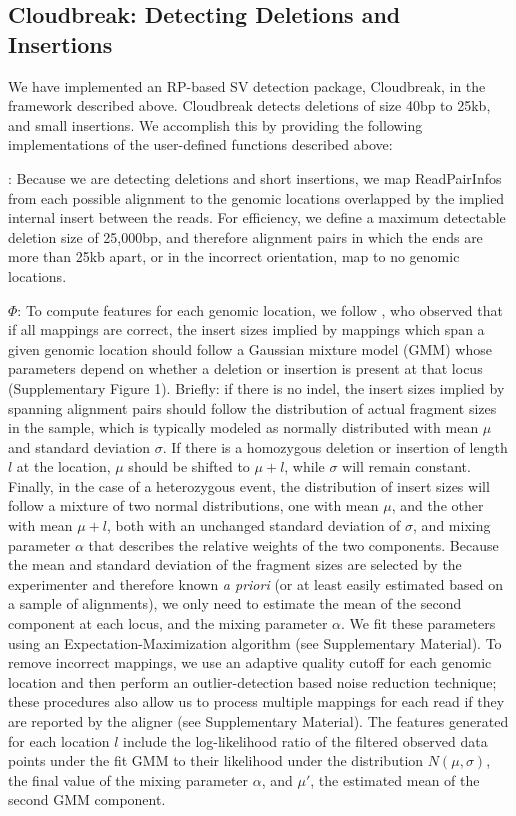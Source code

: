 \documentclass{bioinfo}
\newcommand{\todo}[1]{}
\begin{document}
\begin{methods}
\subsection{Cloudbreak: Detecting Deletions and Insertions}

We have implemented an RP-based SV detection package, Cloudbreak, in the framework described above. Cloudbreak detects deletions of size 40bp to 25kb, and small insertions. We accomplish this by providing the following implementations of the user-defined functions described above:

\textbf{}: Because we are detecting deletions and short insertions, we map ReadPairInfos from each possible alignment to the genomic locations overlapped by the implied internal insert between the reads. For efficiency, we define a maximum detectable deletion size of 25,000bp, and therefore alignment pairs in which the ends are more than 25kb apart, or in the incorrect orientation, map to no genomic locations.

\textbf{$\Phi$}: To compute features for each genomic location, we follow \cite{Lee:2009da}, who observed that if all mappings are correct, the insert sizes implied by mappings which span a given genomic location should follow a Gaussian mixture model (GMM) whose parameters depend on whether a deletion or insertion is present at that locus (Supplementary Figure 1\todo{\ref{Sinsert_size_mixes}}). Briefly: if there is no indel, the insert sizes implied by spanning alignment pairs should follow the distribution of actual fragment sizes in the sample, which is typically modeled as normally distributed with mean $\mu$ and standard deviation $\sigma$. If there is a homozygous deletion or insertion of length $l$ at the location, $\mu$ should be shifted to $\mu + l$, while $\sigma$ will remain constant. Finally, in the case of a heterozygous event, the distribution of insert sizes will follow a mixture of two normal distributions, one with mean $\mu$, and the other with mean $\mu + l$, both with an unchanged standard deviation of $\sigma$, and mixing parameter $\alpha$ that describes the relative weights of the two components. Because the mean and standard deviation of the fragment sizes are selected by the experimenter and therefore known \emph{a priori} (or at least easily estimated based on a sample of alignments), we only need to estimate the mean of the second component at each locus, and the mixing parameter $\alpha$. We fit these parameters using an Expectation-Maximization algorithm (see Supplementary Material). To remove incorrect mappings, we use an adaptive quality cutoff for each genomic location and then perform an outlier-detection based noise reduction technique; these procedures also allow us to process multiple mappings for each read if they are reported by the aligner (see Supplementary Material). The features generated for each location $l$ include the log-likelihood ratio of the filtered observed data points under the fit GMM to their likelihood under the distribution $N(\mu,\sigma)$, the final value of the mixing parameter $\alpha$, and $\mu'$, the estimated mean of the second GMM component.


\end{methods}
\end{document}
